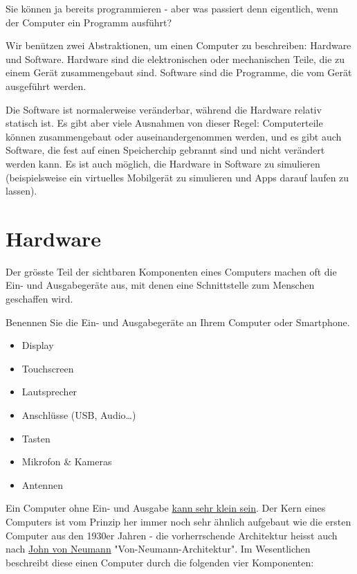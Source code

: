 Sie können ja bereits programmieren - aber was passiert denn eigentlich, wenn der Computer ein Programm ausführt?

Wir benützen zwei Abstraktionen, um einen Computer zu beschreiben: Hardware und Software.
Hardware sind die elektronischen oder mechanischen Teile, die zu einem Gerät zusammengebaut sind. Software sind die Programme, die vom Gerät ausgeführt werden.

Die Software ist normalerweise veränderbar, während die Hardware relativ statisch ist. Es gibt aber viele Ausnahmen von dieser Regel: Computerteile können zusammengebaut oder auseinandergenommen werden, und es gibt auch Software, die fest auf einen Speicherchip gebrannt sind und nicht verändert werden kann. Es ist auch möglich, die Hardware in Software zu simulieren (beispielsweise ein virtuelles Mobilgerät zu simulieren und Apps darauf laufen zu lassen).

\section{Hardware}

Der grösste Teil der sichtbaren Komponenten eines Computers machen oft die Ein- und Ausgabegeräte aus, mit denen eine Schnittstelle zum Menschen geschaffen wird. 

\begin{question}
    Benennen Sie die Ein- und Ausgabegeräte an Ihrem Computer oder Smartphone.
\end{question}
\begin{solution}
    \begin{itemize}
        \item Display
        \item Touchscreen
        \item Lautsprecher
        \item Anschlüsse (USB, Audio…)
        \item Tasten
        \item Mikrofon \& Kameras
        \item Antennen
    \end{itemize}
\end{solution}

Ein Computer ohne Ein- und Ausgabe \href{https://www.google.com/search?q=kleinster+computer+der+welt}{kann sehr klein sein}.
Der Kern eines Computers ist vom Prinzip her immer noch sehr ähnlich aufgebaut wie die ersten Computer aus den 1930er Jahren
 - die vorherrschende Architektur heisst auch nach \href{https://de.wikipedia.org/wiki/John_von_Neumann}{John von Neumann}
"Von-Neumann-Architektur". Im Wesentlichen beschreibt diese einen Computer durch die folgenden vier Komponenten:

